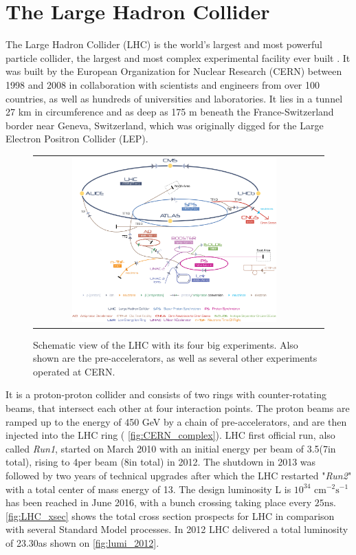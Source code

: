 

\section{The Large Hadron Collider}

The Large Hadron Collider (LHC) is the world's largest and most powerful particle collider, the largest and most complex experimental facility ever built \cite{ipac11:lamont}. It was built by the European Organization for Nuclear Research (CERN) between 1998 and 2008 in collaboration with scientists and engineers from over 100 countries, as well as hundreds of universities and laboratories. It lies in a tunnel 27 km in circumference and as deep as 175 m beneath the France-Switzerland border near Geneva, Switzerland, which was originally digged for the Large Electron Positron Collider (LEP). 

\begin{figure}[tbh!]
	\centering
	\begin{tabular}{cc}
		\includegraphics[width=0.75\textwidth]{detector/pics/CERN_complex.jpg}
	\end{tabular}
	\caption{Schematic view of the LHC with its four big experiments. Also shown are the pre-accelerators, as well as several other experiments operated at CERN.}
	\label{fig:CERN_complex}
\end{figure}

It is a proton-proton collider and consists of two rings with counter-rotating beams, that intersect each other at four interaction points. The proton beams are ramped up to the energy of 450 GeV by a chain of pre-accelerators, and are then injected into the LHC ring ( \autoref{fig:CERN_complex}). LHC first official run, also called \textit{Run1}, started on March 2010 with an initial energy per beam of 3.5\tev (7\tev in total), rising to 4\tev per beam (8\tev in total) in 2012. The shutdown in 2013 was followed by two years of technical upgrades after which the LHC restarted "\textit{Run2}" with a total center of mass energy of 13\tev. The design luminosity L is $10^{34}$ \ensuremath{\text{cm}^{-2}\text{s}^{-1}} has been reached in June 2016, with a bunch crossing taking place every $25 \text{ns}$. \autoref{fig:LHC_xsec} shows the total cross section prospects for LHC in comparison with several Standard Model processes. In 2012 LHC delivered a total luminosity of 23.30\invfb as shown on \autoref{fig:lumi_2012}.

